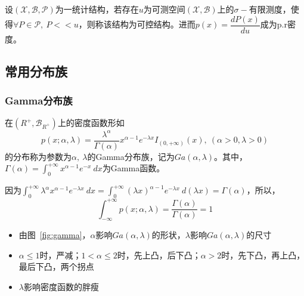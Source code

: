 \begin{definition}[可控结构]
    设$(\mathscr{X},\mathscr{B},\mathscr{P})$为一统计结构，若存在$u$为可测空间$(\mathscr{X},\mathscr{B})$上的$\sigma-$有限测度，使得$\forall P\in \mathscr{P},\ P<<u$，则称该结构为\textcolor{thid1}{可控结构}。进而$p(x) = \dfrac{dP(x)}{du}$成为p.r密度。
\end{definition}

\subsection{常用分布族}
\subsubsection{Gamma分布族}
\begin{definition}[Gamma分布族]
    在$(R^+, \mathscr{B}_{R^+})$上的密度函数形如
    \[
        p(x;\alpha, \lambda) = \dfrac{\lambda^\alpha}{\Gamma(\alpha)}x^{\alpha-1}e^{-\lambda x}I_{(0,+\infty)}(x),\ (\alpha>0, \lambda>0)  
    \]
    的分布称为参数为$\alpha,\ \lambda$的\textcolor{main1}{Gamma分布族}，记为$Ga(\alpha, \lambda)$。其中，$\Gamma(\alpha) = \int_{0}^{+\infty}x^{\alpha-1}e^{-x}\ dx$为Gamma函数。
\end{definition}

\begin{note}
    因为$\int_{0}^{+\infty}\lambda^\alpha x^{\alpha-1}e^{-\lambda x}\ dx= \int_{0}^{+\infty} (\lambda x)^{\alpha-1}e^{-\lambda x}\ d(\lambda x) = \Gamma(\alpha)$，所以，
    \[
        \int_{-\infty}^{+\infty} p(x;\alpha, \lambda) = \dfrac{\Gamma(\alpha)}{\Gamma(\alpha)} = 1
    \]
\end{note}

\begin{note}
    \begin{itemize}
        \item 由图~\ref{fig:gamma}，$\alpha$影响$Ga(\alpha, \lambda)$的形状，$\lambda$影响$Ga(\alpha, \lambda)$的尺寸
        \item $\alpha\leqslant 1$时，严减；$1<\alpha\leqslant 2$时，先上凸，后下凸；$\alpha>2$时，先下凸，再上凸，最后下凸，两个拐点
        \item $\lambda$影响密度函数的胖瘦
    \end{itemize}
\end{note}

